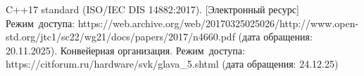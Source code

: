 \begin{thebibliography}{}
	 C++17 standard (ISO/IEC DIS 14882:2017). [Электронный ресурс] Режим~доступа: https://web.archive.org/web/20170325025026/http://www.open-std.org/jtc1/sc22/wg21/docs/papers/2017/n4660.pdf (дата обращения: 20.11.2025).
	 Конвейерная организация. Режим~доступа: https://citforum.ru/hardware/svk/glava\_5.shtml (дата обращения: 24.12.25)
\end{thebibliography}
